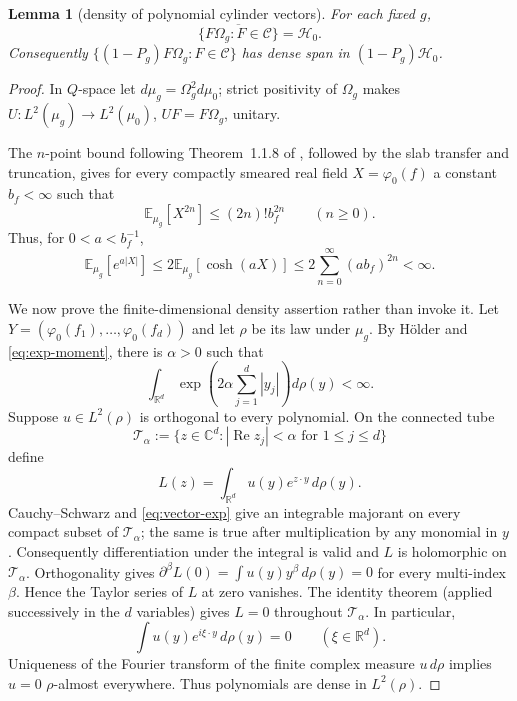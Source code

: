 \documentclass[11pt,a4paper]{article}
\newtheorem{lemma}[theorem]{Lemma}
\theoremstyle{remark}
\newcommand{\R}{\mathbb R}
\newcommand{\Hh}{\mathcal H_0}
\newcommand{\Om}{\Omega}
\newcommand{\E}{\mathbb E}
\begin{document}
\begin{lemma}[density of polynomial cylinder vectors]\label{lem:dense}
For each fixed $g$,
\[
 \overline{\{F\Om_g:F\in\mathscr C\}}=\Hh.
\]
Consequently $\{(1-P_g)F\Om_g:F\in\mathscr C\}$ has dense span in
$(1-P_g)\Hh$.
\end{lemma}

\begin{proof}
In $Q$-space let $d\mu_g=\Om_g^2d\mu_0$; strict positivity of $\Om_g$ makes
$U:L^2(\mu_g)\to L^2(\mu_0)$, $UF=F\Om_g$, unitary.

The $n$-point bound following Theorem~1.1.8 of \cite{GJS}, followed by the slab transfer and
truncation, gives for every compactly smeared real field $X=\varphi_0(f)$ a constant
$b_f<\infty$ such that
\[
 \E_{\mu_g}[X^{2n}]\le(2n)!b_f^{2n}\qquad(n\ge0).                  \tag{5.1}
\]
Thus, for $0<a<b_f^{-1}$,
\begin{equation}\label{eq:exp-moment}
 \E_{\mu_g}[e^{a|X|}]
 \le2\E_{\mu_g}[\cosh(aX)]
 \le2\sum_{n=0}^\infty (ab_f)^{2n}<\infty.                         \tag{5.2}
\end{equation}

We now prove the finite-dimensional density assertion rather than invoke it.  Let
$Y=(\varphi_0(f_1),\ldots,\varphi_0(f_d))$ and let $\rho$ be its law under $\mu_g$.
By H\"older and \eqref{eq:exp-moment}, there is $\alpha>0$ such that
\begin{equation}\label{eq:vector-exp}
 \int_{\R^d}\exp\!\left(2\alpha\sum_{j=1}^d|y_j|\right)d\rho(y)<\infty. \tag{5.3}
\end{equation}
Suppose $u\in L^2(\rho)$ is orthogonal to every polynomial.  On the connected tube
\[
 \mathcal T_\alpha:=\{z\in\mathbb C^d:|\operatorname{Re}z_j|<\alpha
 \text{ for }1\le j\le d\}
\]
define
\[
 L(z)=\int_{\R^d}u(y)e^{z\cdot y}\,d\rho(y).
\]
Cauchy--Schwarz and \eqref{eq:vector-exp} give an integrable majorant on every compact subset
of $\mathcal T_\alpha$; the same is true after multiplication by any monomial in $y$.
Consequently differentiation under the integral is valid and $L$ is holomorphic on
$\mathcal T_\alpha$.  Orthogonality gives
\(
 \partial^\beta L(0)=\int u(y)y^\beta\,d\rho(y)=0
\)
for every multi-index $\beta$.  Hence the Taylor series of $L$ at zero vanishes.  The identity
theorem (applied successively in the $d$ variables) gives $L=0$ throughout
$\mathcal T_\alpha$.  In particular,
\[
 \int u(y)e^{i\xi\cdot y}\,d\rho(y)=0\qquad(\xi\in\R^d).
\]
Uniqueness of the Fourier transform of the finite complex measure $u\,d\rho$ implies
$u=0$ $\rho$-almost everywhere.  Thus polynomials are dense in $L^2(\rho)$.


\end{proof}
\end{document}

